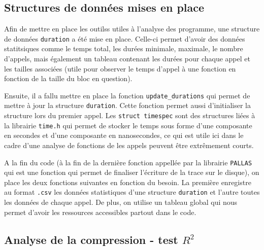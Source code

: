 


\subsection{Structures de données mises en place}\label{ssec:details_durations}

Afin de mettre en place les outilss utiles à l'analyse des programme, une structure de données \verb!duration! a été mise en place.
Celle-ci permet d'avoir des données statitsiques comme le temps total, les durées minimale, maximale, le nombre d'appels, mais également un tableau contenant les durées pour chaque appel et les tailles associées
(utile pour observer le temps d'appel à une fonction en fonction de la taille du bloc en question).


Ensuite, il a fallu mettre en place la fonction \verb!update_durations! qui permet de mettre à jour la structure \verb!duration!. Cette fonction permet aussi d'initialiser la structure
lors du premier appel.
Les \verb!struct timespec! sont des structures liées à la librairie \verb!time.h! qui permet de stocker le temps sous forme d'une composante en secondes et d'une composante en nanosecondes, 
ce qui est utile ici dans le cadre d'une analyse de fonctions de les appels peuvent être extrêmement courts.


A la fin du code (à la fin de la dernière fonction appellée par la librairie \verb!PALLAS! qui est une fonction qui permet de finaliser l'écriture de la trace sur le disque), 
on place les deux fonctions suivantes en fonction du besoin. La première enregistre au format
\verb!.csv! les données statistiques d'une structure \verb!duration! et l'autre toutes les données de chaque appel.
De plus, on utilise un tableau global qui nous permet d'avoir les ressources accessibles partout dans le code.


\subsection{Analyse de la compression - test $R^2$}\label{ssec:comp}


